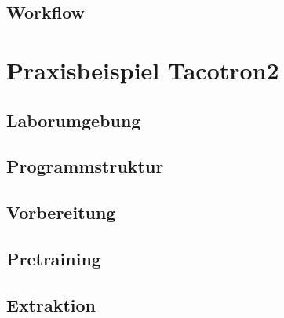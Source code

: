\subsection{Workflow}

\section{Praxisbeispiel Tacotron2}
\subsection{Laborumgebung}
\subsection{Programmstruktur}
\subsection{Vorbereitung}
\subsection{Pretraining}
\subsection{Extraktion}